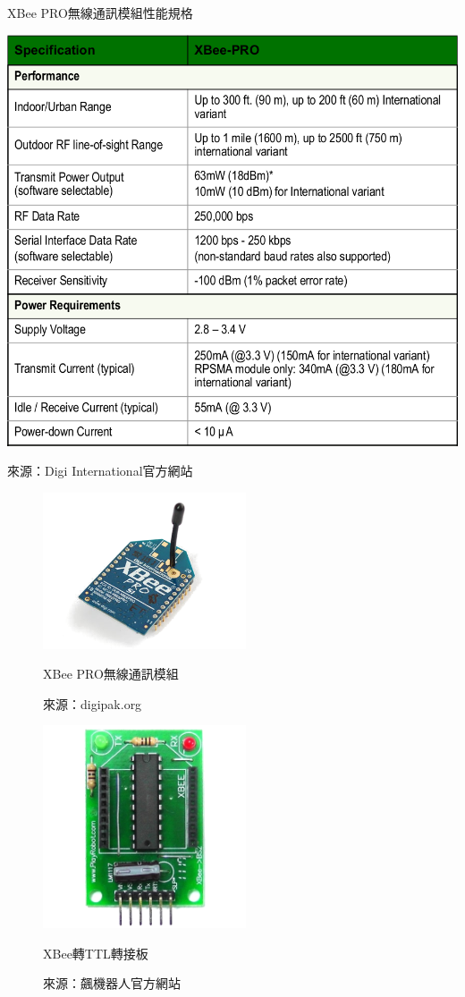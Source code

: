 \begin{table}[h!]
	\centering
	\caption{XBee PRO無線通訊模組性能規格}
	\label{t:xbee_pro}
	\includegraphics[width=\textwidth]{tables/XBee_PRO}
	\caption*{來源：Digi International官方網站}
\end{table}

\begin{figure}[h!]
	\centering
	\includegraphics[width=6cm]{figures/hardware/xbee_pro}
	\caption{XBee PRO無線通訊模組}
	\caption{來源：digipak.org}
	\label{f:xbee_pro}
\end{figure}

\begin{figure}[h!]
	\centering
	\includegraphics[width=6cm]{figures/hardware/xbee2ttl}
	\caption{XBee轉TTL轉接板}
	\caption*{來源：飆機器人官方網站}
	\label{f:xbee2ttl}
\end{figure}

